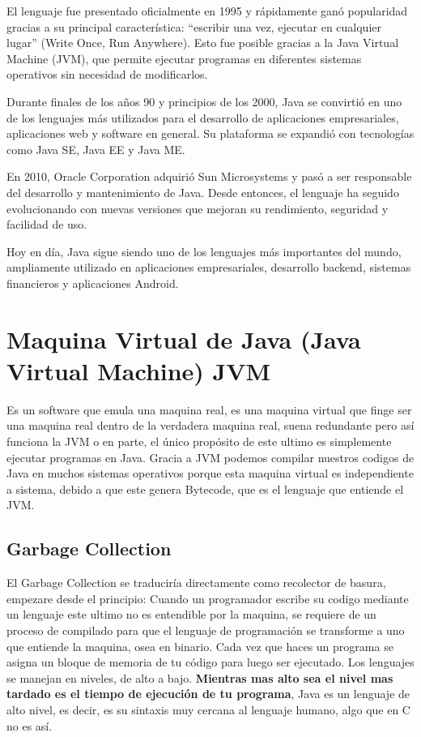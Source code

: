 El lenguaje fue presentado oficialmente en 1995 y rápidamente ganó popularidad gracias a su principal característica: “escribir una vez, ejecutar en cualquier lugar” (Write Once, Run Anywhere). Esto fue posible gracias a la Java Virtual Machine (JVM), que permite ejecutar programas en diferentes sistemas operativos sin necesidad de modificarlos.

Durante finales de los años 90 y principios de los 2000, Java se convirtió en uno de los lenguajes más utilizados para el desarrollo de aplicaciones empresariales, aplicaciones web y software en general. Su plataforma se expandió con tecnologías como Java SE, Java EE y Java ME.

En 2010, Oracle Corporation adquirió Sun Microsystems y pasó a ser responsable del desarrollo y mantenimiento de Java. Desde entonces, el lenguaje ha seguido evolucionando con nuevas versiones que mejoran su rendimiento, seguridad y facilidad de uso.

Hoy en día, Java sigue siendo uno de los lenguajes más importantes del mundo, ampliamente utilizado en aplicaciones empresariales, desarrollo backend, sistemas financieros y aplicaciones Android.

\section{Maquina Virtual de Java (Java Virtual Machine) JVM}
Es un software que emula una maquina real, es una maquina virtual que finge ser una maquina real dentro de la verdadera maquina real, suena redundante pero así funciona la JVM o en parte, el único propósito de este ultimo es simplemente ejecutar programas en Java. Gracia a JVM podemos compilar nuestros codigos de Java en muchos sistemas operativos porque esta maquina virtual es independiente a sistema, debido a que este genera Bytecode, que es el lenguaje que entiende el JVM.

\subsection{Garbage Collection}
El Garbage Collection se traduciría directamente como recolector de basura, empezare desde el principio: Cuando un programador escribe su codigo mediante un lenguaje este ultimo no es entendible por la maquina, se requiere de un proceso de compilado para que el lenguaje de programación se transforme a uno que entiende la maquina, osea en binario. Cada vez que haces un programa se asigna un bloque de memoria de tu código para luego ser ejecutado. Los lenguajes se manejan en niveles, de alto a bajo. \textbf{Mientras mas alto sea el nivel mas tardado es el tiempo de ejecución de tu programa}, Java es un lenguaje de alto nivel, es decir, es su sintaxis muy cercana al lenguaje humano, algo que en C no es así.

